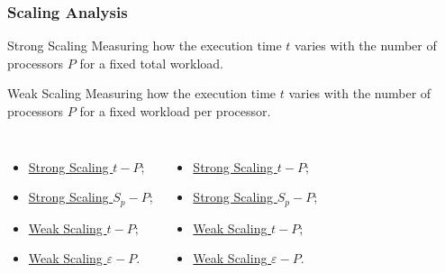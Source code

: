 \documentclass[xcolor=table]{beamer}
\begin{document}
\begin{frame}[t]
\frametitle{Scaling Analysis}

\begin{block}{Strong Scaling}
    Measuring how the execution time $t$ varies with the number of processors $P$ for a fixed total workload.
\end{block}

\begin{block}{Weak Scaling}
    Measuring how the execution time $t$ varies with the number of processors $P$ for a fixed workload per processor.
\end{block}

\begin{columns}

    
    \begin{itemize}
        \item \hyperlink{strong-scaling-time}{ Strong Scaling $t - P$};
        \item \hyperlink{strong-scaling-speedup}{ Strong Scaling $S_p - P$};
        \item \hyperlink{weak-scaling-time}{ Weak Scaling $t - P$};
        \item \hyperlink{weak-scaling-efficiency}{ Weak Scaling $\varepsilon - P$}.
    \end{itemize}


    \begin{itemize}
        \item \hyperlink{omp-strong-scaling-time}{ Strong Scaling $t - P$};
        \item \hyperlink{omp-strong-scaling-speedup}{ Strong Scaling $S_p - P$};
        \item \hyperlink{omp-weak-scaling-time}{ Weak Scaling $t - P$};
        \item \hyperlink{omp-weak-scaling-efficiency}{ Weak Scaling $\varepsilon - P$}.
    \end{itemize}

\end{columns}

\end{frame}
\end{document}

